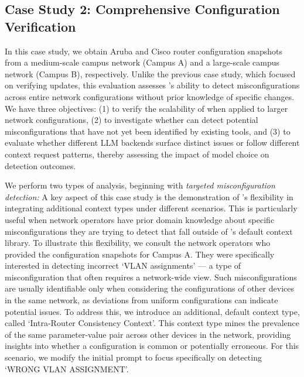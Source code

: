 \subsection{Case Study 2: Comprehensive Configuration Verification}
In this case study, we obtain
Aruba and Cisco router configuration snapshots from a medium-scale campus network (Campus A) and a large-scale campus network (Campus B), respectively. 
Unlike the previous case study, which focused on verifying updates, this evaluation assesses \sysname{}'s ability to detect misconfigurations across entire network configurations without prior knowledge of specific changes.
We have three objectives: (1) to verify the scalability of \sysname{} when applied to larger network configurations, (2) to investigate whether \sysname{} can detect potential misconfigurations that have not yet been identified by existing tools, and (3) to evaluate whether different LLM backends surface distinct issues or follow different context request patterns, thereby assessing the impact of model choice on detection outcomes.

We perform two types of analysis, beginning with \textit{targeted misconfiguration detection:} A key aspect of this case study is the demonstration of \sysname{}'s flexibility in integrating additional context types under different scenarios. This is particularly useful when network operators have prior domain knowledge about specific misconfigurations they are trying to detect that fall outside of \sysname{}'s default context library.
To illustrate this flexibility, we consult the network operators who provided the configuration snapshots for Campus A. They were specifically interested in detecting incorrect `VLAN assignments' --- a type of misconfiguration that often requires a network-wide view. Such misconfigurations are usually identifiable only when considering the configurations of other devices in the same network, as deviations from uniform configurations can indicate potential issues.
To address this, we introduce an additional, default context type, called `Intra-Router Consistency Context'.  This context type mines  the prevalence of the same parameter-value pair across other devices in the network, providing insights into whether a configuration is common or potentially erroneous. For this scenario, we modify the initial prompt to focus specifically on detecting `WRONG VLAN ASSIGNMENT'. 


